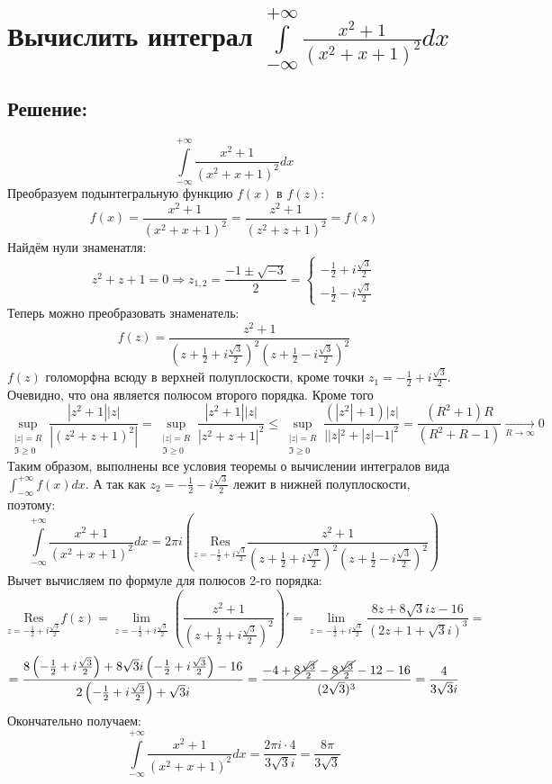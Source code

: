 \documentclass{article}
\begin{document}
	\section{Вычислить интеграл $\int\limits_{-\infty}^{+\infty} \frac{x^2+1}{\left(x^2 + x + 1\right)^2}dx$}
	\subsection{Решение:}
	\[\int\limits_{-\infty}^{+\infty} \frac{x^2+1}{\left(x^2 + x + 1\right)^2}dx\]
	Преобразуем подынтегральную функцию $f(x)$ в $f(z)$:
	\[f(x) = \frac{x^2+1}{\left(x^2 + x + 1\right)^2}  = \frac{z^2+1}{\left(z^2 + z + 1\right)^2} = f(z)\]
	Найдём нули знаменатля:
	\[z^2 + z + 1 = 0 \Rightarrow z_{1,2} = \frac{-1 \pm \sqrt{-3}}{2} = \begin{cases}
		-\frac{1}{2} + i \frac{\sqrt{3}}{2}\\
		-\frac{1}{2} - i \frac{\sqrt{3}}{2}
	\end{cases}\]
	Теперь можно преобразовать знаменатель:
	\[f(z) = \frac{z^2 + 1}{\left(z+\frac{1}{2} + i\frac{\sqrt{3}}{2}\right)^2 \left(z+\frac{1}{2} - i\frac{\sqrt{3}}{2}\right)^2}\]
	$f(z)$ голоморфна всюду в верхней полуплоскости, кроме точки $z_1 = -\frac{1}{2} + i \frac{\sqrt{3}}{2}$. Очевидно, что она является полюсом второго порядка.\newline
	Кроме того
	\[\sup\limits_{\substack{|z|= R\\\Im\ge0}} \frac{|z^2+1||z|}{|(z^2+z+1)^2|} = \sup\limits_{\substack{|z|= R\\\Im\ge0}} \frac{|z^2+1||z|}{|z^2+z+1|^2} \le \sup\limits_{\substack{|z|= R\\\Im\ge0}}\frac{(|z^2| + 1)|z|}{||z|^2 + |z| - 1|^2} = \frac{(R^2 + 1)R}{(R^2 +R-1)} \underset{R\rightarrow\infty}{\rightarrow}0\]
	Таким образом, выполнены все условия теоремы о вычислении интегралов вида $\int_{-\infty}^{+\infty}f(x)dx$. А так как $z_2 = -\frac{1}{2} - i \frac{\sqrt{3}}{2}$ лежит в нижней полуплоскости, поэтому:
	\[\int\limits_{-\infty}^{+\infty} \frac{x^2+1}{\left(x^2 + x + 1\right)^2}dx = 2\pi i \left(\underset{z=-\frac{1}{2} + i\frac{\sqrt{3}}{2}}{\text{Res}}\frac{z^2 + 1}{\left(z+\frac{1}{2} + i\frac{\sqrt{3}}{2}\right)^2 \left(z+\frac{1}{2} - i\frac{\sqrt{3}}{2}\right)^2}\right)\]
	Вычет вычисляем по формуле для полюсов 2-го порядка:
	\[\underset{z=-\frac{1}{2} + i\frac{\sqrt{3}}{2}}{\text{Res}} f(z) = \lim\limits_{z=-\frac{1}{2} + i\frac{\sqrt{3}}{2}} \left(\frac{z^2+1}{\left(z + \frac{1}{2} + i\frac{\sqrt{3}}{2}\right)^2}\right)' = \lim\limits_{z=-\frac{1}{2} + i\frac{\sqrt{3}}{2}} \frac{8z+8\sqrt{3}iz - 16}{(2z+1+\sqrt{3}i)^3} =\]
	\[= \frac{8\left(-\frac{1}{2} + i\frac{\sqrt{3}}{2}\right) + 8\sqrt{3}i\left(-\frac{1}{2} + i\frac{\sqrt{3}}{2}\right) - 16}{2\left(-\frac{1}{2} + i\frac{\sqrt{3}}{2}\right) + \sqrt{3}i} = \frac{-4  + \cancel{8\frac{\sqrt{3}}{2}} -  \cancel{8\frac{\sqrt{3}}{2}} - 12 - 16}{(2\sqrt{3})^3} = \frac{4}{3\sqrt{3}i}\]
	Окончательно получаем:
	\[\int\limits_{-\infty}^{+\infty} \frac{x^2+1}{\left(x^2 + x + 1\right)^2}dx = \frac{2\pi i \cdot 4}{3\sqrt{3}i} = \frac{8\pi}{3\sqrt{3}}\]
\end{document}
